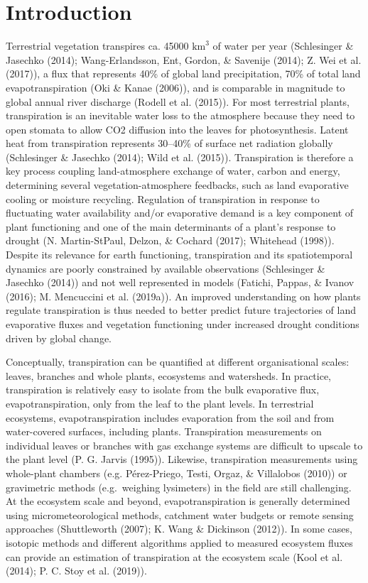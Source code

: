 \documentclass[11pt,twoside]{reedthesis}
\begin{document}
\newpage

\section{Introduction}\label{introduction}

Terrestrial vegetation transpires ca. 45000 \(\text{km}^3\) of water per
year (Schlesinger \& Jasechko (2014); Wang-Erlandsson, Ent, Gordon, \&
Savenije (2014); Z. Wei et al. (2017)), a flux that represents 40\% of
global land precipitation, 70\% of total land evapotranspiration (Oki \&
Kanae (2006)), and is comparable in magnitude to global annual river
discharge (Rodell et al. (2015)). For most terrestrial plants,
transpiration is an inevitable water loss to the atmosphere because they
need to open stomata to allow CO2 diffusion into the leaves for
photosynthesis. Latent heat from transpiration represents 30--40\% of
surface net radiation globally (Schlesinger \& Jasechko (2014); Wild et
al. (2015)). Transpiration is therefore a key process coupling
land-atmosphere exchange of water, carbon and energy, determining
several vegetation-atmosphere feedbacks, such as land evaporative
cooling or moisture recycling. Regulation of transpiration in response
to fluctuating water availability and/or evaporative demand is a key
component of plant functioning and one of the main determinants of a
plant's response to drought (N. Martin-StPaul, Delzon, \& Cochard
(2017); Whitehead (1998)). Despite its relevance for earth functioning,
transpiration and its spatiotemporal dynamics are poorly constrained by
available observations (Schlesinger \& Jasechko (2014)) and not well
represented in models (Fatichi, Pappas, \& Ivanov (2016); M. Mencuccini
et al. (2019a)). An improved understanding on how plants regulate
transpiration is thus needed to better predict future trajectories of
land evaporative fluxes and vegetation functioning under increased
drought conditions driven by global change.\par

Conceptually, transpiration can be quantified at different
organisational scales: leaves, branches and whole plants, ecosystems and
watersheds. In practice, transpiration is relatively easy to isolate
from the bulk evaporative flux, evapotranspiration, only from the leaf
to the plant levels. In terrestrial ecosystems, evapotranspiration
includes evaporation from the soil and from water-covered surfaces,
including plants. Transpiration measurements on individual leaves or
branches with gas exchange systems are difficult to upscale to the plant
level (P. G. Jarvis (1995)). Likewise, transpiration measurements using
whole-plant chambers (e.g. Pérez-Priego, Testi, Orgaz, \& Villalobos
(2010)) or gravimetric methods (e.g.~weighing lysimeters) in the field
are still challenging. At the ecosystem scale and beyond,
evapotranspiration is generally determined using micrometeorological
methods, catchment water budgets or remote sensing approaches
(Shuttleworth (2007); K. Wang \& Dickinson (2012)). In some cases,
isotopic methods and different algorithms applied to measured ecosystem
fluxes can provide an estimation of transpiration at the ecosystem scale
(Kool et al. (2014); P. C. Stoy et al. (2019)).\par
\end{document}
